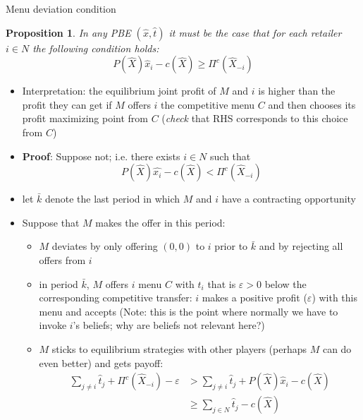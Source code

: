 \documentclass[11pt,english]{beamer}
\newcommand{\ve}{\varepsilon}
\newtheorem{proposition}{Proposition}
\begin{document}
\begin{frame}[allowframebreaks]{Menu deviation condition}
  \begin{proposition} \label{propos:menudeviation}
    In any PBE $(\hat{x},\hat{t})$ it must be the case that for
    each retailer $i \in N$ the following condition holds:
    \begin{equation}
      \label{eq:MenuDeviation}
      \tag{MD} P(\hat{X})\hat{x}_i - c(\hat{X}) \geq \Pi^c(\hat{X}_{-i})
    \end{equation}
  \end{proposition}
  \begin{itemize}
  \item Interpretation: the equilibrium joint profit of $M$ and $i$ is
    higher than the profit they can get if $M$ offers $i$ the
    competitive menu $C$ and then chooses its profit maximizing point
    from $C$ (\emph{check} that RHS corresponds to this choice from $C$)
  \item \textbf{Proof}: Suppose not; i.e. there exists $i \in N$ such that
    \begin{equation} \label{eq:SN}
      P(\hat{X})\hat{x_i} - c(\hat{X}) < \Pi^c(\hat{X}_{-i})
    \end{equation}
  \item let $\bar{k}$ denote the last period in which $M$ and $i$ have
    a contracting opportunity
  \item Suppose that $M$ makes the offer in this period:
    \begin{itemize}
    \item $M$ deviates by only offering $(0,0)$ to $i$ prior to
      $\bar{k}$ and by rejecting all offers from $i$
    \item in period $\bar{k}$, $M$ offers $i$ menu $C$ with $t_i$ that
      is $\ve >0$ below the corresponding competitive transfer: $i$
      makes a positive profit ($\ve$) with this menu and accepts
      (Note: this is the point where normally we have to invoke $i$'s
      beliefs; why are beliefs not relevant here?)
    \item $M$ sticks to equilibrium strategies with other players
      (perhaps $M$ can do even better) and gets payoff:
        \begin{align}
          \sum_{j \neq i} \hat{t}_j + \Pi^c(\hat{X}_{-i}) - \ve &>
          \sum_{j \neq i} \hat{t}_j + P(\hat{X})\hat{x}_i - c(\hat{X})
          \\
          & \geq  \sum_{j \in N} \hat{t}_j - c(\hat{X})
        \end{align}

\end{itemize}
\end{itemize}
\end{frame}
\end{document}
